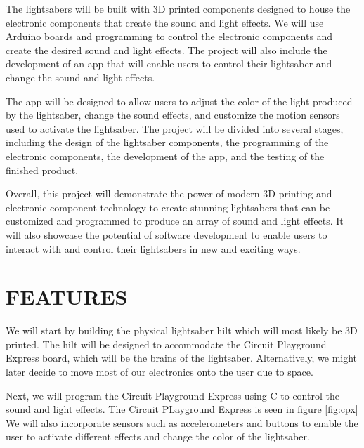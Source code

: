 \documentclass[12pt]{article}
\begin{document}
The lightsabers will be built with 3D printed components designed to house the electronic components that create the sound and light effects. We will use Arduino boards and programming to control the electronic components and create the desired sound and light effects. The project will also include the development of an app that will enable users to control their lightsaber and change the sound and light effects.

The app will be designed to allow users to adjust the color of the light produced by the lightsaber, change the sound effects, and customize the motion sensors used to activate the lightsaber. The project will be divided into several stages, including the design of the lightsaber components, the programming of the electronic components, the development of the app, and the testing of the finished product.

Overall, this project will demonstrate the power of modern 3D printing and electronic component technology to create stunning lightsabers that can be customized and programmed to produce an array of sound and light effects. It will also showcase the potential of software development to enable users to interact with and control their lightsabers in new and exciting ways.
\section{FEATURES}

We will start by building the physical lightsaber hilt which will most likely be 3D printed. The hilt will be designed to accommodate the Circuit Playground Express board, which will be the brains of the lightsaber. Alternatively, we might later decide to move most of our electronics onto the user due to space.

Next, we will program the Circuit Playground Express using C to control the sound and light effects. The Circuit PLayground Express is seen in figure \ref{fig:cpx} We will also incorporate sensors such as accelerometers and buttons to enable the user to activate different effects and change the color of the lightsaber.
\end{document}
